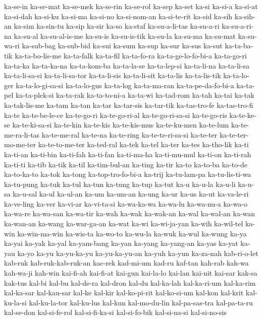 {ka-se-in ka-se-mat ka-se-mek ka-se-rin ka-se-rol ka-sep ka-set ka-si
ka-si-a ka-si-at ka-si-dah ka-si-ku ka-si-ma ka-si-no ka-si-nom-an
ka-si-te-rit ka-sid ka-sih ka-sih-an ka-sim ka-sin-tu ka-sip ka-sir ka-so
ka-staf ka-su-a-li-tas ka-su-a-ri ka-su-a-ri-na ka-su-al ka-su-al-is-me
ka-su-is ka-su-is-tik ka-su-la ka-su-ma ka-su-mat ka-su-wa-ri ka-sub-bag
ka-sub-bid ka-sui ka-sum ka-sup ka-sur ka-sus ka-sut ka-ta-ba-tik
ka-ta-bo-lis-me ka-ta-falk ka-ta-fil ka-ta-fo-ra ka-ta-ge-lo-fo-bi-a
ka-ta-go-ri ka-ta-ka ka-ta-ka-na ka-ta-kom-ba ka-ta-la-se ka-ta-lep-si
ka-ta-li-na ka-ta-li-sa ka-ta-li-sa-si ka-ta-li-sa-tor ka-ta-li-sis
ka-ta-li-sit ka-ta-lis ka-ta-lis-tik ka-ta-lo-ger ka-ta-lo-gi-sa-si
ka-ta-lo-gus ka-ta-log ka-ta-ma-ran ka-ta-pe-da-fo-bi-a ka-ta-pel
ka-ta-plek-si ka-ta-rak ka-ta-to-ni-a ka-ta-wi ka-tad-rom ka-tah ka-tai
ka-tak ka-tak-lis-me ka-tam ka-tan ka-tar ka-tar-sis ka-tar-tik
ka-tas-tro-fe ka-tas-tro-fi ka-te ka-te-be-le-ce ka-te-go-ri
ka-te-go-ri-al ka-te-go-ri-sa-si ka-te-go-ris ka-te-ke-se ka-te-ki-sa-si
ka-te-kin ka-te-kis ka-te-kis-mus ka-te-ku-men ka-te-lum
ka-te-me-ra-li-tas ka-te-me-ral ka-te-na ka-te-ring ka-te-te-ri-sa-si
ka-te-ter ka-te-ter-mo-me-ter ka-te-to-me-ter ka-ted-ral ka-tek ka-tel
ka-ter ka-tes ka-tho-lik ka-ti ka-ti-an ka-ti-bin ka-ti-fah ka-ti-fan
ka-ti-ma-ha ka-ti-mu-mul ka-ti-on ka-ti-rah ka-ti-ti ka-tib ka-tik ka-til
ka-tim-bul-an ka-ting ka-tir ka-to ka-to-ba ka-to-de ka-to-ka-to ka-tok
ka-tong ka-top-tro-fo-bi-a ka-trij ka-tu-lam-pa ka-tu-lis-ti-wa ka-tu-pung
ka-tuk ka-tul ka-tun ka-tung ka-tup ka-tut ka-u ka-u-la ka-u-li ka-u-sa
ka-u-sal ka-ul ka-ul-an ka-um ka-um-an ka-ung ka-ur ka-us ka-ut
ka-va-le-ri ka-ve-ling ka-ver ka-vi-ar ka-vi-ta-si ka-wa-ka-wa ka-wa-lu
ka-wa-nu-a ka-wa-o ka-wa-re ka-wa-san ka-wa-tir ka-wah ka-wak ka-wak-an
ka-wal ka-wal-an ka-wan ka-wan-an ka-wang ka-war-ga-an ka-wat ka-wi
ka-wi-ja-yan ka-wih ka-wil-tel ka-win ka-win-ma-win ka-wis-ta ka-wo-to
ka-wu-la ka-wuk ka-wul ka-wung ka-ya ka-yai ka-yak ka-yal ka-yam-bang
ka-yan ka-yang ka-yang-an ka-yas ka-yat ka-yau ka-yo ka-yu ka-yu-ka-yu
ka-yu-ka-yu-an ka-yuh ka-yun ka-za-nah kab-ri-o-let kab-ruk
kab-ruk-kab-ruk-an kac-rek kad-mi-um kad-ru kaf-tan kah-rab kah-wa
kah-wa-ji kah-win kai-fi-ah kai-fi-at kai-gun kai-la-lo kai-lan kai-nit
kai-sar kak-sa kak-tus kal-bi kal-bu kal-de-ra kal-dron kal-du kal-ka-lah
kal-ka-ri-um kal-ka-rim kal-ka-sar kal-kau-sar kal-ke kal-kir
kal-ko-pi-rit kal-ko-si-um kal-kon kal-krit kal-ku-la-si kal-ku-la-tor
kal-ku-lus kal-kun kal-mo-du-lin kal-pa-sas-tra kal-pa-ta-ru kal-se-don
kal-si-fe-rol kal-si-fi-ka-si kal-si-fo-bik kal-si-na-si kal-si-no-sis
}

